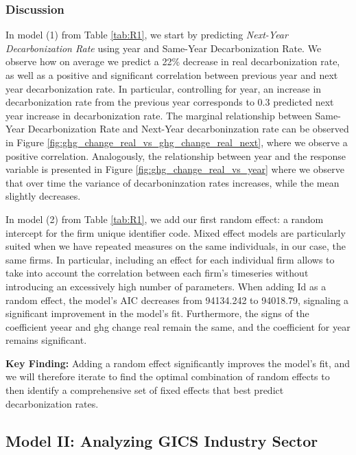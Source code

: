 \subsubsection{Discussion}
In model (1) from Table \ref{tab:R1}, we start by predicting \textit{Next-Year Decarbonization Rate} using year and Same-Year Decarbonization Rate. We observe how on average we predict a 22\% decrease in real decarbonization rate, as well as a positive and significant correlation between previous year and next year decarbonization rate. In particular, controlling for year, an increase in decarbonization rate from the previous year corresponds to 0.3 predicted next year increase in decarbonization rate. The marginal relationship between Same-Year Decarbonization Rate and Next-Year decarboninzation rate can be observed in Figure \ref{fig:ghg_change_real_vs_ghg_change_real_next}, where we observe a positive correlation. Analogously, the relationship between year and the response variable is presented in Figure \ref{fig:ghg_change_real_vs_year} where we observe that over time the variance of decarboninzation rates increases, while the mean slightly decreases.


In model (2) from Table \ref{tab:R1}, we add our first random effect: a random intercept for the firm unique identifier code. Mixed effect models are particularly suited when we have repeated measures on the same individuals, in our case, the same firms. In particular, including an effect for each individual firm allows to take into account the correlation between each firm's timeseries without introducing an excessively high number of parameters. When adding Id as a random effect, the model's AIC decreases from 94134.242 to 94018.79, signaling a significant improvement in the model's fit. Furthermore, the signs of the coefficient yeear and ghg change real remain the same, and the coefficient for year remains significant. 


\textbf{Key Finding:} Adding a random effect significantly improves the model's fit, and we will therefore iterate to find the optimal combination of random effects to then identify a comprehensive set of fixed effects that best predict decarbonization rates. 








\subsection{Model II: Analyzing GICS Industry Sector}

